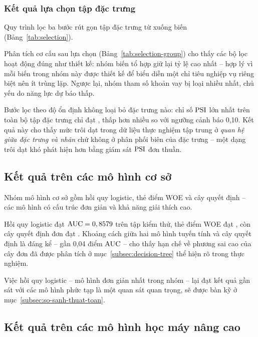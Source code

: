 \subsubsection{Kết quả lựa chọn tập đặc trưng}

Quy trình lọc ba bước rút gọn tập đặc trưng từ \NFeaturesInitial{} xuống
\NFeaturesSelected{} biến (Bảng~\ref{tab:selection}).





Phân tích cơ cấu sau lựa chọn (Bảng~\ref{tab:selection-group}) cho thấy các bộ
lọc hoạt động đúng như thiết kế: nhóm biến tổ hợp giữ lại tỷ lệ cao nhất -- hợp
lý vì mỗi biến trong nhóm này được thiết kế để biểu diễn một chỉ tiêu nghiệp vụ
riêng biệt nên ít trùng lặp. Ngược lại, nhóm tham số khoản vay bị loại nhiều
nhất, chủ yếu do năng lực dự báo thấp.

Bước lọc theo độ ổn định không loại bỏ đặc trưng nào: chỉ số $\mathrm{PSI}$
lớn nhất trên toàn bộ tập đặc trưng chỉ đạt \MaxPSI{}, thấp hơn nhiều so với
ngưỡng cảnh báo 0,10. Kết quả này cho thấy mức trôi dạt trong dữ liệu thực nghiệm
tập trung ở \textit{quan hệ giữa đặc trưng và nhãn} chứ không ở phân phối biên
của đặc trưng -- một dạng trôi dạt khó phát hiện hơn bằng giám sát $\mathrm{PSI}$ đơn
thuần.

\subsection{Kết quả trên các mô hình cơ sở}
\label{subsec:kq-mo-hinh-co-so}

Nhóm mô hình cơ sở gồm hồi quy logistic, thẻ điểm WOE và cây quyết định -- các mô
hình có cấu trúc đơn giản và khả năng giải thích cao.

Hồi quy logistic đạt $\mathrm{AUC} = 0,8579{}$ trên tập kiểm thử, thẻ điểm WOE đạt
\WOEAUC{}, còn cây quyết định đơn đạt \DTAUC{}. Khoảng cách giữa hai mô hình
tuyến tính và cây quyết định là đáng kể -- gần 0,04 điểm $\mathrm{AUC}$ -- cho thấy hạn
chế về phương sai cao của cây đơn đã được phân tích ở
mục~\ref{subsec:decision-tree} thể hiện rõ trong thực nghiệm.

Việc hồi quy logistic -- mô hình đơn giản nhất trong nhóm -- lại đạt kết quả gần
sát với các mô hình phức tạp là một quan sát quan trọng, sẽ được bàn kỹ ở
mục~\ref{subsec:so-sanh-thuat-toan}.

\subsection{Kết quả trên các mô hình học máy nâng cao}
\label{subsec:kq-mo-hinh-nang-cao}

